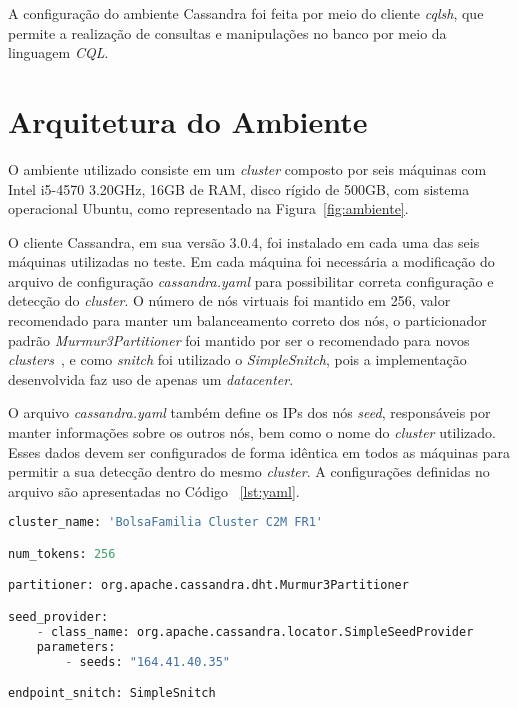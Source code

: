 
A configuração do ambiente Cassandra foi feita por meio do cliente \emph{cqlsh}, que permite a realização de consultas e manipulações no banco por meio da linguagem \emph{CQL}.

\section{Arquitetura do Ambiente}
O ambiente utilizado consiste em um \emph{cluster} composto por seis máquinas com Intel i5-4570 3.20GHz, 16GB de RAM, disco rígido de 500GB, com sistema operacional Ubuntu, como representado na Figura~\ref{fig:ambiente}.


O cliente Cassandra, em sua versão 3.0.4, foi instalado em cada uma das seis máquinas utilizadas no teste. Em cada máquina foi necessária a modificação do arquivo de configuração \emph{cassandra.yaml} para possibilitar correta configuração e detecção do \emph{cluster}. O número de nós virtuais foi mantido em 256, valor recomendado para manter um balanceamento correto dos nós, o particionador padrão \emph{Murmur3Partitioner} foi mantido por ser o recomendado para novos \emph{clusters}~\cite{cassandrapartitioners}, e como \emph{snitch} foi utilizado o \emph{SimpleSnitch}, pois a implementação desenvolvida faz uso de apenas um \emph{datacenter}. 

O arquivo \emph{cassandra.yaml} também define os IPs dos nós \emph{seed}, responsáveis por manter informações sobre os outros nós, bem como o nome do \emph{cluster} utilizado. Esses dados devem ser configurados de forma idêntica em todos as máquinas para permitir a sua detecção dentro do mesmo \emph{cluster}. A configurações definidas no arquivo são apresentadas no Código ~\ref{lst:yaml}.

\begin{lstlisting}[caption={Configuração cassandra.yaml},label={lst:yaml},language=python]
cluster_name: 'BolsaFamilia Cluster C2M FR1'

num_tokens: 256

partitioner: org.apache.cassandra.dht.Murmur3Partitioner

seed_provider:
	- class_name: org.apache.cassandra.locator.SimpleSeedProvider
	parameters:
		- seeds: "164.41.40.35"

endpoint_snitch: SimpleSnitch

\end{lstlisting}

